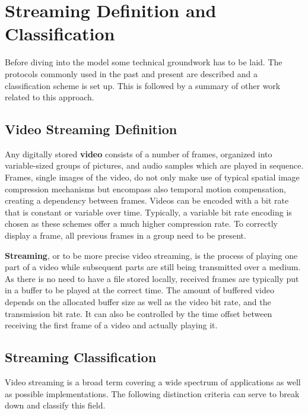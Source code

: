 \section{Streaming Definition and Classification}
\label{c3:sec:background}

Before diving into the model some technical groundwork has to be laid. The protocols commonly used in the past and present are described and a classification scheme is set up. This is followed by a summary of other work related to this approach.


\subsection{Video Streaming Definition} 

Any digitally stored \textbf{video} consists of a number of frames, organized into variable-sized groups of pictures, and audio samples which are played in sequence. Frames, single images of the video, do not only make use of typical spatial image compression mechanisms but encompass also temporal motion compensation, creating a dependency between frames. Videos can be encoded with a bit rate that is constant or variable over time. Typically, a variable bit rate encoding is chosen as these schemes offer a much higher compression rate. To correctly display a frame, all previous frames in a group need to be present. 

\textbf{Streaming}, or to be more precise video streaming, is the process of playing one part of a video while subsequent parts are still being transmitted over a medium. As there is no need to have a file stored locally, received frames are typically put in a buffer to be played at the correct time. The amount of buffered video depends on the allocated buffer size as well as the video bit rate, and the transmission bit rate. It can also be controlled by the time offset between receiving the first frame of a video and actually playing it.


\subsection{Streaming Classification}

Video streaming is a broad term covering a wide spectrum of applications as well as possible implementations. The following distinction criteria can serve to break down and classify this field.

